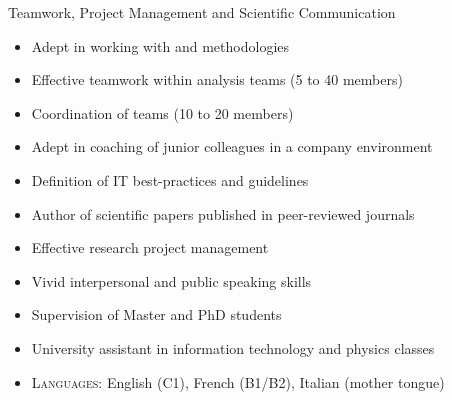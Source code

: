 \begin{cvskills}
\cvskill
{Teamwork, Project Management and Scientific Communication} %
{
\begin{minipage}{0.49\textwidth}
\vspace{0.3em}
\begin{itemize}[labelwidth=\the\widest,align=right,leftmargin=!,labelsep=1pt,noitemsep]
\item[\custItem] Adept in working with \textsc{\color{awesome}{Agile}} and
\textsc{\color{awesome}{Scrum}} methodologies
\item[\custItem] Effective teamwork within analysis teams (5 to 40 members)
\item[\custItem] Coordination of teams (10 to 20 members)
\item[\custItem] Adept in coaching of junior colleagues in a company environment
\item[\custItem] Definition of IT best-practices and guidelines
\end{itemize}
\end{minipage}
\hfill
\begin{minipage}{0.49\textwidth}
\vspace{0.3em}
\begin{itemize}[labelwidth=\the\widest,align=right,leftmargin=!,labelsep=1pt,noitemsep]
\item[\custItem] Author of scientific papers published in peer-reviewed
journals
\item[\custItem] Effective research project management
\item[\custItem] Vivid interpersonal and public speaking skills
\item[\custItem] Supervision of Master and PhD students
\item[\custItem] University assistant in information technology and physics classes
\end{itemize}
\end{minipage}
\begin{itemize}[labelwidth=\the\widest,align=right,leftmargin=!,labelsep=1pt,noitemsep]
\item[] \textsc{\color{awesome}Languages:} English (C1), French (B1/B2),
Italian (mother tongue)
\end{itemize}
}
%

\end{cvskills}
